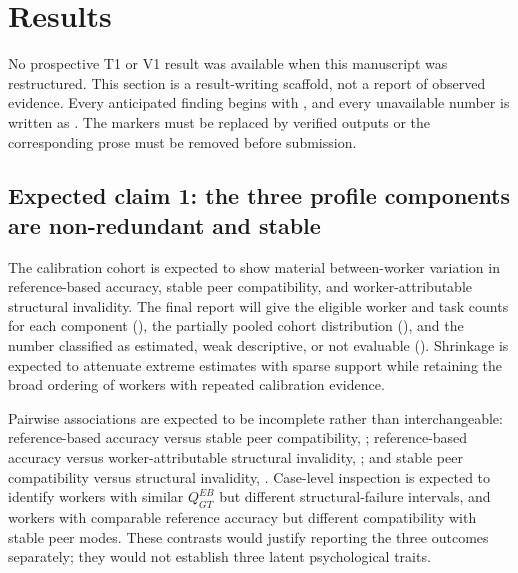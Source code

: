 \section{Results}
\label{sec:results}

No prospective T1 or V1 result was available when this manuscript was restructured. This section is a result-writing scaffold, not a report of observed evidence. Every anticipated finding begins with \expectedresult{}, and every unavailable number is written as \tbddata{}. The markers must be replaced by verified outputs or the corresponding prose must be removed before submission.

\subsection{Expected claim 1: the three profile components are non-redundant and stable \expectedresult{}}


\expectedresult{} The calibration cohort is expected to show material between-worker variation in reference-based accuracy, stable peer compatibility, and worker-attributable structural invalidity. The final report will give the eligible worker and task counts for each component (\tbddata{}), the partially pooled cohort distribution (\tbddata{}), and the number classified as estimated, weak descriptive, or not evaluable (\tbddata{}). Shrinkage is expected to attenuate extreme estimates with sparse support while retaining the broad ordering of workers with repeated calibration evidence.

\expectedresult{} Pairwise associations are expected to be incomplete rather than interchangeable: reference-based accuracy versus stable peer compatibility, \tbddata{}; reference-based accuracy versus worker-attributable structural invalidity, \tbddata{}; and stable peer compatibility versus structural invalidity, \tbddata{}. Case-level inspection is expected to identify workers with similar $Q_{GT}^{EB}$ but different structural-failure intervals, and workers with comparable reference accuracy but different compatibility with stable peer modes. These contrasts would justify reporting the three outcomes separately; they would not establish three latent psychological traits.

